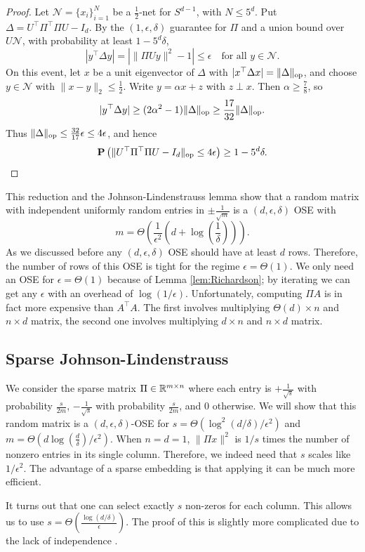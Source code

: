 \begin{proof}
Let $\mathcal{N}=\{x_{i}\}^{N}_{i=1}$ be a $\frac{1}{2}$-net for
$S^{d-1}$, with $N\leq5^{d}$. Put $\Delta=U^{\top}\Pi^{\top}\Pi U-I_{d}$.
By the $(1,\epsilon,\delta)$ guarantee for $\Pi$ and a union bound
over $U\mathcal{N}$, with probability at least $1-5^{d}\delta$,
\[
|y^{\top}\Delta y|=\left|\|\Pi Uy\|^{2}-1\right|\leq\epsilon\quad\text{for all }y\in\mathcal{N}.
\]
On this event, let $x$ be a unit eigenvector of $\Delta$ with $|x^{\top}\Delta x|=\|\Delta\|_{\mathrm{op}}$,
and choose $y\in\mathcal{N}$ with $\|x-y\|_{2}\leq\frac{1}{2}$.
Write $y=\alpha x+z$ with $z\perp x$. Then $\alpha\geq\frac{7}{8}$,
so
\[
|y^{\top}\Delta y|\geq(2\alpha^{2}-1)\|\Delta\|_{\mathrm{op}}\geq\frac{17}{32}\|\Delta\|_{\mathrm{op}}.
\]
Thus $\|\Delta\|_{\mathrm{op}}\leq\frac{32}{17}\epsilon\leq4\epsilon$, and
hence
\[
\mathbf{P}\left(\|U^{\top}\Pi^{\top}\Pi U-I_{d}\|_{\mathrm{op}}\leq4\epsilon\right)\geq1-5^{d}\delta.
\]
\end{proof}
This reduction and the Johnson-Lindenstrauss lemma show that a random
matrix with independent uniformly random entries in $\pm\frac{1}{\sqrt{m}}$
is a $(d,\epsilon,\delta)$ OSE with
\[
m=\Theta(\frac{1}{\epsilon^{2}}(d+\log(\frac{1}{\delta}))).
\]
As we discussed before any $(d,\epsilon,\delta)$ OSE should have
at least $d$ rows. Therefore, the number of rows of this OSE is tight
for the regime $\epsilon=\Theta(1)$. We only need an OSE for $\epsilon=\Theta(1)$
because of Lemma \ref{lem:Richardson}; by iterating we can get any
$\epsilon$ with an overhead of $\log(1/\epsilon)$. Unfortunately,
computing $\Pi A$ is in fact more expensive than $A^{\top}A$. The
first involves multiplying $\Theta(d)\times n$ and $n\times d$ matrix,
the second one involves multiplying $d\times n$ and $n\times d$
matrix.

\subsection{Sparse Johnson-Lindenstrauss}

We consider the sparse matrix $\Pi\in\mathbb{R}^{m\times n}$ where each entry
is $+\frac{1}{\sqrt{s}}$ with probability $\frac{s}{2m}$, $-\frac{1}{\sqrt{s}}$
with probability $\frac{s}{2m}$, and $0$ otherwise. We will show
that this random matrix is a $(d,\epsilon,\delta)$-OSE for $s=\Theta(\log^{2}(d/\delta)/\epsilon^{2})$
and $m=\Theta(d\log(\frac{d}{\delta})/\epsilon^{2})$. When $n=d=1$,
$\|\Pi x\|^{2}$ is $1/s$ times the number of nonzero entries in
its single column. Therefore, we indeed need that $s$ scales like
$1/\epsilon^{2}$. The advantage of a sparse embedding is that applying
it can be much more efficient.
\begin{rem}
It turns out that one can select exactly $s$ non-zeros for each column.
This allows us to use $s=\Theta(\frac{\log(d/\delta)}{\epsilon})$.
The proof of this is slightly more complicated due to the lack of
independence \cite{cohen2016nearly}.
\end{rem}

